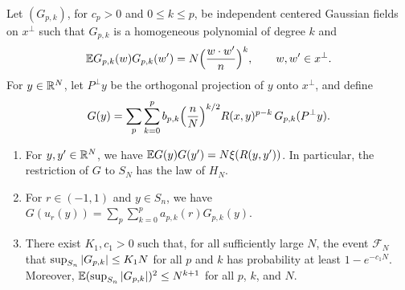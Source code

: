 \begin{lemma}\label{lem:pl-banks}
Let $(G_{p,k})$, for $c_p>0$ and $0\le k\le p$, be independent centered Gaussian fields on $x^\perp$ such that $G_{p,k}$ is a homogeneous polynomial of degree $k$ and
\[
\mathbb E G_{p,k}(w)G_{p,k}(w')=N\Bigl(\frac{w\cdot w'}n\Bigr)^k,\qquad w,w'\in x^\perp .
\]
For $y\in\mathbb R^N$, let $P^\perp y$ be the orthogonal projection of $y$ onto $x^\perp$, and define
\begin{equation}\label{eq:pl-G}
G(y)=\sum_p\sum_{k=0}^pb_{p,k}\Bigl(\frac nN\Bigr)^{k/2}R(x,y)^{p-k}\,G_{p,k}(P^\perp y).
\end{equation}
\begin{enumerate}
\item For $y,y'\in\mathbb R^N$, we have $\mathbb E G(y)G(y')=N\xi(R(y,y'))$. In particular, the restriction of $G$ to $S_N$ has the law of $H_N$.
\item For $r\in(-1,1)$ and $y\in S_n$, we have $G(u_r(y))=\sum_p\sum_{k=0}^pa_{p,k}(r)G_{p,k}(y)$.
\item There exist $K_1,c_1>0$ such that, for all sufficiently large $N$, the event $\mathcal F_N$ that $\sup_{S_n}\left|G_{p,k}\right|\le K_1N$ for all $p$ and $k$ has probability at least $1-e^{-c_1N}$. Moreover, $\mathbb E(\sup_{S_n}\left|G_{p,k}\right|)^2\le N^{k+1}$ for all $p$, $k$, and $N$.
\end{enumerate}
\end{lemma}

